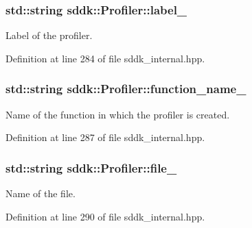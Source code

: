 \subsubsection[{label\+\_\+}]{\setlength{\rightskip}{0pt plus 5cm}std\+::string sddk\+::\+Profiler\+::label\+\_\+\hspace{0.3cm}{\ttfamily [private]}}\label{classsddk_1_1_profiler_a0002ab96e7c57f2681b24aaa699c1780}


Label of the profiler. 



Definition at line 284 of file sddk\+\_\+internal.\+hpp.

\hypertarget{classsddk_1_1_profiler_a7c9d9cd04df09edb557a10d77d10cd50}{}
\subsubsection[{function\+\_\+name\+\_\+}]{\setlength{\rightskip}{0pt plus 5cm}std\+::string sddk\+::\+Profiler\+::function\+\_\+name\+\_\+\hspace{0.3cm}{\ttfamily [private]}}\label{classsddk_1_1_profiler_a7c9d9cd04df09edb557a10d77d10cd50}


Name of the function in which the profiler is created. 



Definition at line 287 of file sddk\+\_\+internal.\+hpp.

\hypertarget{classsddk_1_1_profiler_a9c326d39981f3ed63f58a0329c408b2e}{}
\subsubsection[{file\+\_\+}]{\setlength{\rightskip}{0pt plus 5cm}std\+::string sddk\+::\+Profiler\+::file\+\_\+\hspace{0.3cm}{\ttfamily [private]}}\label{classsddk_1_1_profiler_a9c326d39981f3ed63f58a0329c408b2e}


Name of the file. 



Definition at line 290 of file sddk\+\_\+internal.\+hpp.

\hypertarget{classsddk_1_1_profiler_a9a3f56b94bb94e03aa901d2d272e21fa}{}
